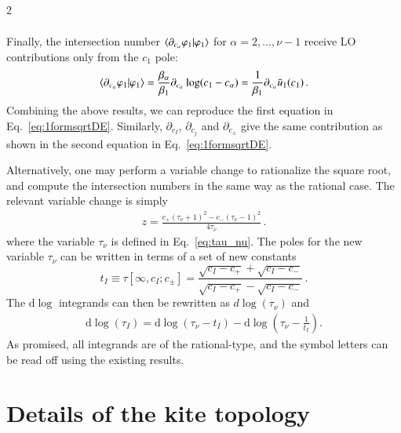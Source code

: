 \documentclass[fleqn]{2023SCGE}
\newcommand{\nd}{\mathrm{d}}
\begin{document}
\begin{multicols}{2}
\begin{appendix}
\begin{align}
\end{align}
Finally, the intersection number $\braket{\partial_{c_\alpha} \varphi_1 | \varphi_1}$ for $\alpha=2,\ldots,\nu-1$ receive LO contributions only from the $c_1$ pole:
\begin{equation}
\braket{\partial_{c_\alpha} \varphi_1 | \varphi_1} = \frac{\beta_\alpha}{\beta_1} \partial_{c_\alpha} \log(c_1-c_\alpha) = \frac{1}{\beta_1} \partial_{c_\alpha} \bar{u}_1(c_1) \,.
\end{equation}
Combining the above results, we can reproduce the first equation in Eq.~\eqref{eq:1formsqrtDE}. Similarly, $\partial_{c_I}$, $\partial_{c_j}$ and $\partial_{c_\pm}$ give the same contribution as shown in the second equation in Eq.~\eqref{eq:1formsqrtDE}.

Alternatively, one may perform a variable change to rationalize the square root, and compute the intersection numbers in the same way as the rational case. The relevant variable change is simply
\begin{align}
z = \frac{c_+ (\tau_\nu+1)^2 - c_- (\tau_\nu-1)^2}{4 \tau_\nu} \,.
\end{align}
where the variable $\tau_\nu$ is defined in Eq.~\eqref{eq:tau_nu}.
The poles for the new variable $\tau_\nu$ can be written in terms of  a set of new constants
\begin{equation}
    t_I \equiv \tau[\infty,c_I;c_\pm] = \frac{\sqrt{c_I-c_+} + \sqrt{c_I-c_-}}{\sqrt{c_I-c_+} - \sqrt{c_I-c_-}} \,.
\end{equation}
The $\nd\log$ integrands can then be rewritten as $d\log(\tau_\nu)$ and
\begin{align}
\nd\log(\tau_I) = \nd \log (\tau_\nu-t_I) - \nd \log \left(\tau_\nu-\frac{1}{t_I} \right) .
\end{align}
As promised, all integrands are of the rational-type, and the symbol letters can be read off using the existing results.




\section{Details of the kite topology} \label{app3}


\end{appendix}
\end{multicols}
\end{document}
